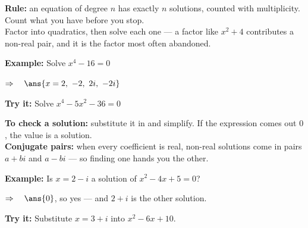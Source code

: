 \documentclass[12pt]{article}
\begin{document}

\begin{formulabox}
\textbf{Rule:} an equation of degree $n$ has exactly $n$ solutions, counted with
multiplicity. Count what you have before you stop.\\[3pt]
Factor into quadratics, then solve each one --- a factor like $x^{2} + 4$
contributes a non-real pair, and it is the factor most often abandoned.
\end{formulabox}

\begin{examplebox}
\textbf{Example:} \quad Solve $x^{4} - 16 = 0$

$\Rightarrow\quad \ans{x = 2,\ -2,\ 2i,\ -2i}$
\end{examplebox}

\begin{tryitbox}
\textbf{Try it:} \quad Solve $x^{4} - 5x^{2} - 36 = 0$\\[2pt]
\end{tryitbox}


\begin{formulabox}
\textbf{To check a solution:} substitute it in and simplify. If the expression
comes out $0$, the value is a solution.\\[3pt]
\textbf{Conjugate pairs:} when every coefficient is real, non-real solutions
come in pairs $a + bi$ and $a - bi$ --- so finding one hands you the other.
\end{formulabox}

\begin{examplebox}
\textbf{Example:} \quad Is $x = 2 - i$ a solution of $x^{2} - 4x + 5 = 0$?

$\Rightarrow\quad \ans{0}$, so yes --- and $2 + i$ is the other solution.
\end{examplebox}

\begin{tryitbox}
\textbf{Try it:} \quad Substitute $x = 3 + i$ into $x^{2} - 6x + 10$.\\[2pt]
\end{tryitbox}
\end{document}
